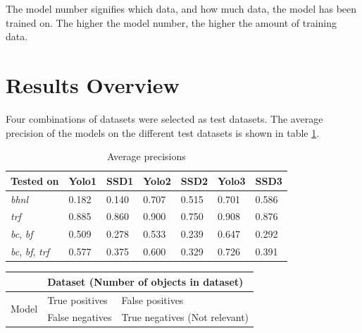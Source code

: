 \vspace{3mm}

The model number signifies which data, and how much data, the model has been trained on. The higher the model number, the higher the amount of training data.


\section{Results Overview}

Four combinations of datasets were selected as test datasets. The average precision of the models on the different test datasets is shown in table \ref{ap_tab}. 

\begin{table}[h!]
\centering
\begin{tabular}{l|ll|ll|ll}
Tested on   & Yolo1 & SSD1  & Yolo2 & SSD2  & Yolo3 & SSD3  \\ \hline
\textit{bhnl}        & 0.182 & 0.140 & 0.707 & 0.515 & 0.701 & 0.586 \\
\textit{trf}         & 0.885 & 0.860 & 0.900 & 0.750 & 0.908 & 0.876 \\
\textit{bc}, \textit{bf}      & 0.509 & 0.278 & 0.533 & 0.239 & 0.647 & 0.292 \\
\textit{bc}, \textit{bf}, \textit{trf} & 0.577 & 0.375 & 0.600 & 0.329 & 0.726 & 0.391
\end{tabular}
\caption{Average precisions}
\label{ap_tab}
\end{table}


\begin{table}[]
\centering
\begin{tabular}{c|ll}
\multicolumn{1}{l|}{}  & \multicolumn{2}{l}{Dataset (Number of objects in dataset)} \\ \hline
\multirow{2}{*}{Model} & True positives        & False positives                    \\
                       & False negatives       & True negatives (Not relevant)     
\end{tabular}
\end{table}

